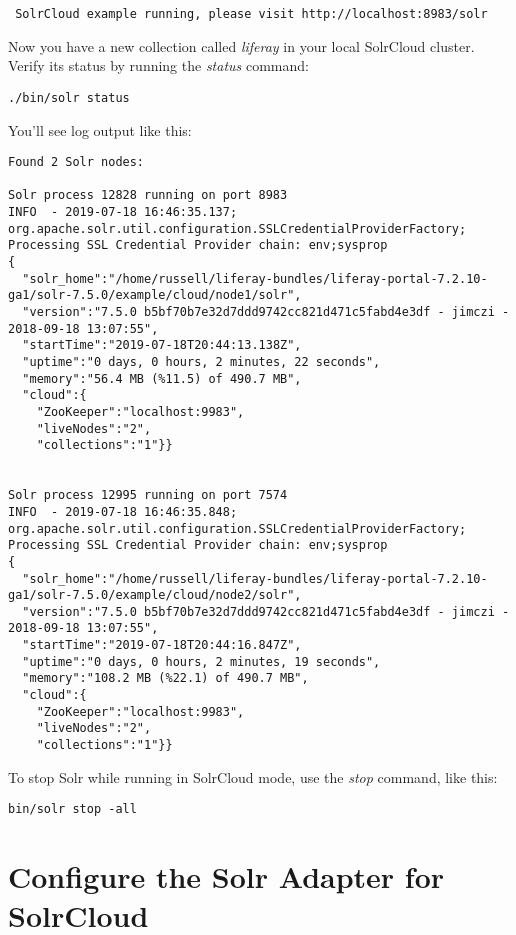 \begin{enumerate}
\begin{verbatim}
 SolrCloud example running, please visit http://localhost:8983/solr
\end{verbatim}
\end{enumerate}

Now you have a new collection called \emph{liferay} in your local
SolrCloud cluster. Verify its status by running the \emph{status}
command:

\begin{verbatim}
./bin/solr status
\end{verbatim}

You'll see log output like this:

\begin{verbatim}
Found 2 Solr nodes: 

Solr process 12828 running on port 8983
INFO  - 2019-07-18 16:46:35.137; org.apache.solr.util.configuration.SSLCredentialProviderFactory; Processing SSL Credential Provider chain: env;sysprop
{
  "solr_home":"/home/russell/liferay-bundles/liferay-portal-7.2.10-ga1/solr-7.5.0/example/cloud/node1/solr",
  "version":"7.5.0 b5bf70b7e32d7ddd9742cc821d471c5fabd4e3df - jimczi - 2018-09-18 13:07:55",
  "startTime":"2019-07-18T20:44:13.138Z",
  "uptime":"0 days, 0 hours, 2 minutes, 22 seconds",
  "memory":"56.4 MB (%11.5) of 490.7 MB",
  "cloud":{
    "ZooKeeper":"localhost:9983",
    "liveNodes":"2",
    "collections":"1"}}


Solr process 12995 running on port 7574
INFO  - 2019-07-18 16:46:35.848; org.apache.solr.util.configuration.SSLCredentialProviderFactory; Processing SSL Credential Provider chain: env;sysprop
{
  "solr_home":"/home/russell/liferay-bundles/liferay-portal-7.2.10-ga1/solr-7.5.0/example/cloud/node2/solr",
  "version":"7.5.0 b5bf70b7e32d7ddd9742cc821d471c5fabd4e3df - jimczi - 2018-09-18 13:07:55",
  "startTime":"2019-07-18T20:44:16.847Z",
  "uptime":"0 days, 0 hours, 2 minutes, 19 seconds",
  "memory":"108.2 MB (%22.1) of 490.7 MB",
  "cloud":{
    "ZooKeeper":"localhost:9983",
    "liveNodes":"2",
    "collections":"1"}}
\end{verbatim}

To stop Solr while running in SolrCloud mode, use the \emph{stop}
command, like this:

\begin{verbatim}
bin/solr stop -all
\end{verbatim}

\section{Configure the Solr Adapter for
SolrCloud}\label{configure-the-solr-adapter-for-solrcloud}

